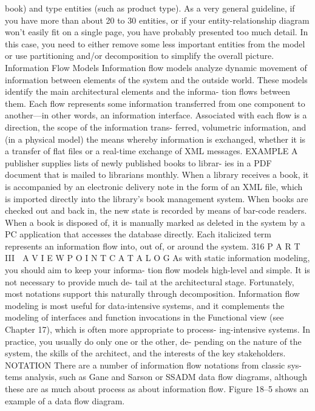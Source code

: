 book) and type entities (such as product type).
As a very general guideline, if you have more than about 20 to 30
entities, or if your entity-relationship diagram won’t easily fit on a single
page, you have probably presented too much detail. In this case, you need to
either remove some less important entities from the model or use partitioning
and/or decomposition to simplify the overall picture.
Information Flow Models
Information flow models analyze dynamic movement of information between
elements of the system and the outside world.
These models identify the main architectural elements and the informa-
tion flows between them. Each flow represents some information transferred
from one component to another—in other words, an information interface.
Associated with each flow is a direction, the scope of the information trans-
ferred, volumetric information, and (in a physical model) the means whereby
information is exchanged, whether it is a transfer of flat files or a real-time
exchange of XML messages.
EXAMPLE A publisher supplies lists of newly published books to librar-
ies in a PDF document that is mailed to librarians monthly. When a
library receives a book, it is accompanied by an electronic delivery note
in the form of an XML file, which is imported directly into the library’s
book management system. When books are checked out and back in,
the new state is recorded by means of bar-code readers. When a book is
disposed of, it is manually marked as deleted in the system by a PC
application that accesses the database directly.
Each italicized term represents an information flow into, out of, or
around the system.
316
 P A R T III  A V I E W P O I N T C A T A L O G
As with static information modeling, you should aim to keep your informa-
tion flow models high-level and simple. It is not necessary to provide much de-
tail at the architectural stage. Fortunately, most notations support this naturally
through decomposition.
Information flow modeling is most useful for data-intensive systems, and
it complements the modeling of interfaces and function invocations in the
Functional view (see Chapter 17), which is often more appropriate to process-
ing-intensive systems. In practice, you usually do only one or the other, de-
pending on the nature of the system, the skills of the architect, and the
interests of the key stakeholders.
NOTATION There are a number of information flow notations from classic sys-
tems analysis, such as Gane and Sarson or SSADM data flow diagrams,
although these are as much about process as about information flow.
Figure 18–5 shows an example of a data flow diagram.
